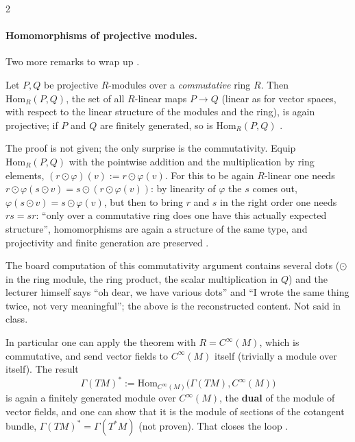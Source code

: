 \begin{paracol}{2}
\paragraph{Homomorphisms of projective modules.} Two more remarks to wrap up .
\begin{theorem}\label{thm:rm-hom}
Let $P,Q$ be projective $R$-modules over a \emph{commutative} ring $R$. Then $\mathrm{Hom}_R(P,Q)$, the set of all $R$-linear maps $P\to Q$ (linear as for vector spaces, with respect to the linear structure of the modules and the ring), is again projective; if $P$ and $Q$ are finitely generated, so is $\mathrm{Hom}_R(P,Q)$     .
\end{theorem}
The proof is not given; the only surprise is the commutativity. Equip $\mathrm{Hom}_R(P,Q)$ with the pointwise addition and the multiplication by ring elements, $(r\odot\varphi)(v):=r\odot\varphi(v)$. For this to be again $R$-linear one needs $r\odot\varphi(s\odot v)=s\odot(r\odot\varphi(v))$: by linearity of $\varphi$ the
$s$ comes out, $\varphi(s\odot v)=s\odot\varphi(v)$, but then to bring $r$ and $s$ in the right order one needs $rs=sr$: ``only over a commutative ring does one have this actually expected structure'', homomorphisms are again a structure of the same type, and projectivity and finite generation are preserved
       .
\begin{coursenote}
The board computation of this commutativity argument contains several dots ($\odot$ in the ring module, the ring product, the scalar multiplication in $Q$) and the lecturer himself says ``oh dear, we have various dots'' and ``I wrote the same thing twice, not very meaningful''; the above is the reconstructed content. Not said in class. 
\end{coursenote}

In particular one can apply the theorem with $R=C^\infty(M)$, which is commutative, and send vector fields to $C^\infty(M)$ itself (trivially a module over itself). The result
\[
  \Gamma(TM)^*:=\mathrm{Hom}_{C^\infty(M)}\bigl(\Gamma(TM),C^\infty(M)\bigr)
\]
is again a finitely generated module over $C^\infty(M)$, the \textbf{dual} of the module of vector fields, and one can show that it is the module of sections of the cotangent bundle, $\Gamma(TM)^*=\Gamma(T^*M)$ (not proven). That closes the loop    .


\end{paracol}
